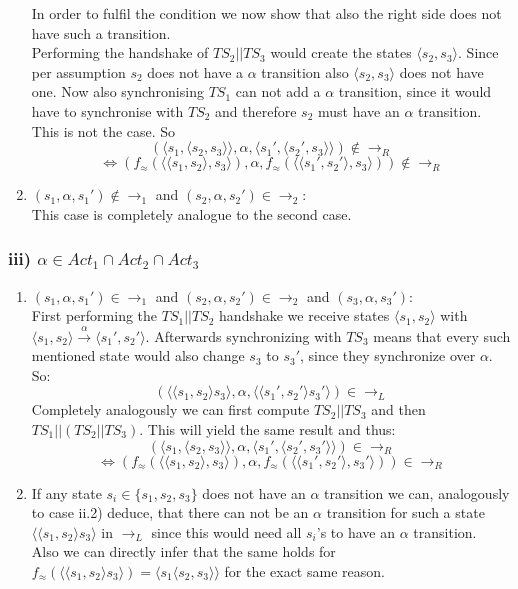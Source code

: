 \documentclass[11pt]{article}
\begin{document}
\begin{enumerate}
		In order to fulfil the condition we now show that also the right side does not have such a transition.\\
		
		Performing the handshake of $TS_2||TS_3$ would create the states $\langle s_2, s_3 \rangle$. Since per assumption $s_2$ does not have a $\alpha$ transition also $\langle s_2, s_3 \rangle$ does not have one. Now also synchronising $TS_1$ can not add a $\alpha$ transition, since it would have to synchronise with $TS_2$ and therefore $s_2$ must have an $\alpha$ transition. This is not the case. So 
		$$(\langle s_1 , \langle s_2 , s_3 \rangle \rangle,\alpha, \langle s_1' , \langle s_2' , s_3 \rangle \rangle)\notin \rightarrow_R$$
		$$\Leftrightarrow(f_\approx(\langle \langle s_1 , s_2 \rangle, s_3 \rangle),\alpha, f_\approx(\langle \langle s_1' , s_2' \rangle, s_3 \rangle))\notin \rightarrow_R$$
		
		
		\item $(s_1,\alpha, s_1')\notin \rightarrow_1$ and $(s_2,\alpha, s_2')\in \rightarrow_2$:\\
		This case is completely analogue to the second case.
		
	\end{enumerate}
	
	\subsubsection*{iii) $\alpha \in Act_1 \cap Act_2 \cap Act_3$}
	\begin{enumerate}
		\item  $(s_1,\alpha, s_1')\in \rightarrow_1$ and $(s_2,\alpha, s_2')\in \rightarrow_2$ and $(s_3, \alpha, s_3')$:\\
		First performing the $TS_1 ||TS_2$ handshake we receive states $\langle s_1, s_2 \rangle$ with $\langle s_1, s_2 \rangle \xrightarrow{\alpha} \langle s_1', s_2' \rangle$. Afterwards synchronizing with $TS_3$ means that every such mentioned state would also change $s_3$ to $s_3'$, since they synchronize over $\alpha$. So:
		$$ (\langle \langle s_1 , s_2 \rangle s_3 \rangle, \alpha, \langle \langle s_1' , s_2' \rangle s_3' \rangle) \in \rightarrow_L$$
		Completely analogously we can first compute $TS_2||TS_3$ and then $TS_1 || (TS_2 || TS_3)$. This will yield the same result and thus:
		$$(\langle s_1 , \langle s_2 , s_3 \rangle \rangle,\alpha, \langle s_1' , \langle s_2' , s_3' \rangle \rangle)\in \rightarrow_R$$
		$$\Leftrightarrow(f_\approx(\langle \langle s_1 , s_2 \rangle, s_3 \rangle),\alpha, f_\approx(\langle \langle s_1' , s_2' \rangle, s_3' \rangle))\in \rightarrow_R$$
		\item If any state $s_i \in \{s_1, s_2, s_3\}$ does not have an $\alpha$ transition we can, analogously to case ii.2) deduce, that there can not be an $\alpha$ transition for such a state $\langle \langle s_1, s_2 \rangle s_3 \rangle$ in $\rightarrow_L$ since this would need all $s_i$'s to have an $\alpha$ transition.\\
		Also we can directly infer that the same holds for $f_\approx (\langle \langle s_1, s_2 \rangle s_3 \rangle) = \langle s_1 \langle s_2 , s_3 \rangle \rangle$ for the exact same reason.
	\end{enumerate}
	
\end{document}
